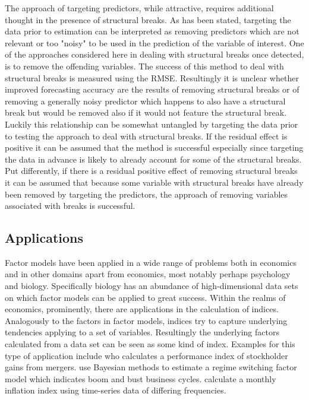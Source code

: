 \documentclass[12pt]{article}
\begin{document}
The approach of targeting predictors, while attractive, requires additional thought in the presence of structural breaks. As has been stated, targeting the data prior to estimation can be interpreted as removing predictors which are not relevant or too "noisy" to be used in the prediction of the variable of interest. One of the approaches considered here in dealing with structural breaks once detected, is to remove the offending variables. The success of this method to deal with structural breaks is measured using the RMSE. Resultingly it is unclear whether improved forecasting accuracy are the results of removing structural breaks or of removing a generally noisy predictor which happens to also have a structural break but would be removed also if it would not feature the structural break. Luckily this relationship can be somewhat untangled by targeting the data prior to testing the approach to deal with structural breaks. If the residual effect is positive it can be assumed that the method is successful especially since targeting the data in advance is likely to already account for some of the structural breaks. Put differently, if there is a residual positive effect of removing structural breaks it can be assumed that because some variable with structural breaks have already been removed by targeting the predictors, the approach of removing variables associated with breaks is successful.


\subsection{Applications}
Factor models have been applied in a wide range of problems both in economics and in other domains apart from economics, most notably perhaps psychology and biology. Specifically biology has an abundance of high-dimensional data sets on which factor models can be applied to great success. Within the realms of economics, prominently, there are applications in the calculation of indices. Analogously to the factors in factor models, indices try to capture underlying tendencies applying to a set of variables. Resultingly the underlying factors calculated from a data set can be seen as some kind of index. Examples for this type of application include \citet{langetieg1978application} who calculates a performance index of stockholder gains from mergers. \citet{kim1998business} use Bayesian methods to estimate a regime switching factor model which indicates boom and bust business cycles. \citet{altissimo2001eurocoin} calculate a monthly inflation index using time-series data of differing frequencies.
\end{document}
